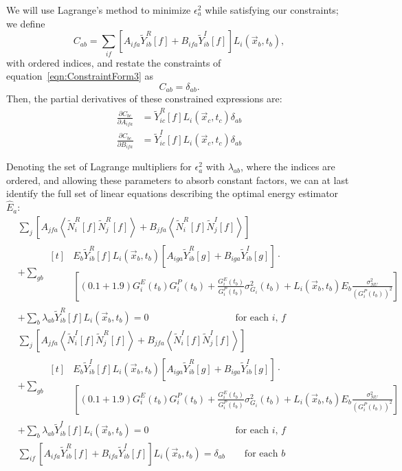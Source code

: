 We will use Lagrange's method to minimize $\epsilon^2_a$ while satisfying our constraints; we define
\[C_{ab} = \sum_{if}\left[A_{ifa} \widetilde{Y}_{ib}^R[f] + B_{ifa} \widetilde{Y}_{ib}^I[f]\right] L_i(\vec{x}_b,t_b),\]
with ordered indices, and restate the constraints of equation~\ref{eqn:ConstraintForm3} as
\[C_{ab} = \delta_{ab}.\]
Then, the partial derivatives of these constrained expressions are:
\begin{align*}
\frac{\partial C_{bc}}{\partial A_{ifa}} &= \widetilde{Y}^R_{ic}[f] L_i(\vec{x}_c,t_c) \delta_{ab} \\
\frac{\partial C_{bc}}{\partial B_{ifa}} &= \widetilde{Y}^I_{ic}[f] L_i(\vec{x}_c,t_c) \delta_{ab}
\end{align*}

Denoting the set of Lagrange multipliers for $\epsilon^2_a$ with $\lambda_{ab}$, where the indices are ordered, and allowing these parameters to absorb constant factors, we can at last identify the full set of linear equations describing the optimal energy estimator $\widehat{E}_a$:
\begin{align*}
&\sum_j \left[ A_{jfa} \left<\widetilde{N}_i^R[f]\widetilde{N}_j^R[f]\right> + B_{jfa} \left<\widetilde{N}_i^R[f]\widetilde{N}_j^I[f]\right>\right]\\
&+ \sum_{gb} \begin{aligned}[t]
  & E_b\widetilde{Y}_{ib}^R[f] L_i(\vec{x}_b,t_b)\left[A_{iga} \widetilde{Y}_{ib}^R[g] + B_{iga} \widetilde{Y}_{ib}^I[g]\right] \cdot \\
  & \left[ (0.1 + 1.9) G^E_i(t_b) G^P_i(t_b) + \frac{G^E_i(t_b)}{G^P_i(t_b)} \sigma^2_{G_i}(t_b) + L_i(\vec{x}_b,t_b) E_b \frac{\sigma^2_{NU}}{\left(G^P_i(t_b)\right)^2} \right] \end{aligned} \\
&+ \sum_b \lambda_{ab} \widetilde{Y}^R_{ib}[f] L_i(\vec{x}_b,t_b) = 0 \qquad \qquad \qquad \qquad \quad \text{for each $i$, $f$}\\
%
&\sum_j \left[ A_{jfa} \left<\widetilde{N}_i^I[f]\widetilde{N}_j^R[f]\right> + B_{jfa} \left<\widetilde{N}_i^I[f]\widetilde{N}_j^I[f]\right>\right]\\
&+ \sum_{gb} \begin{aligned}[t]
  & E_b\widetilde{Y}_{ib}^I[f] L_i(\vec{x}_b,t_b)\left[A_{iga} \widetilde{Y}_{ib}^R[g] + B_{iga} \widetilde{Y}_{ib}^I[g]\right] \cdot \\
  & \left[ (0.1 + 1.9) G^E_i(t_b) G^P_i(t_b) + \frac{G^E_i(t_b)}{G^P_i(t_b)} \sigma^2_{G_i}(t_b) + L_i(\vec{x}_b,t_b) E_b \frac{\sigma^2_{NU}}{\left(G^P_i(t_b)\right)^2} \right] \end{aligned} \\
&+ \sum_b \lambda_{ab} \widetilde{Y}^I_{ib}[f] L_i(\vec{x}_b,t_b) = 0 \qquad \qquad \qquad \qquad \quad \text{for each $i$, $f$}\\
%
&\sum_{if}\left[A_{ifa} \widetilde{Y}_{ib}^R[f] + B_{ifa} \widetilde{Y}_{ib}^I[f]\right] L_i(\vec{x}_b,t_b) = \delta_{ab} \qquad \text{for each $b$}
\end{align*}

